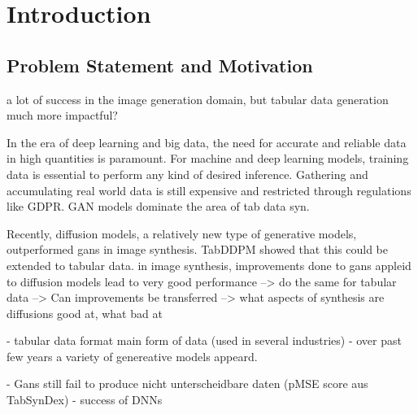 \chapter{Introduction}
\label{ch:introduction}

\section{Problem Statement and Motivation} 
\label{ch:intro-problemStatement}



a lot of success in the image generation domain, but tabular data generation much more impactful?

In the era of deep learning and big data, the need for accurate and reliable data in high quantities is paramount.
For machine and deep learning models, training data is essential to perform any kind of desired inference.
Gathering and accumulating real world data is still expensive and restricted through regulations like GDPR.
GAN models dominate the area of tab data syn.

Recently, diffusion models, a relatively new type of generative models, outperformed gans in image synthesis.
TabDDPM showed that this could be extended to tabular data.
in image synthesis, improvements done to gans appleid to diffusion models lead to very good performance 
--> do the same for tabular data
--> Can improvements be transferred
--> what aspects of synthesis are diffusions good at, what bad at

- tabular data format main form of data (used in several industries)
- over past few years a variety of genereative models appeard.

- Gans still fail to produce nicht unterscheidbare daten (pMSE score aus TabSynDex)
- success of DNNs \cite{borisov2022DeepNeuralNetworks}






